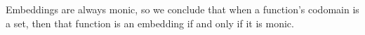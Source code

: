 Embeddings are always monic, so we conclude that when a function's codomain is a set, then that function is an embedding if and only if it is monic.
\ccpad
\begin{code}%
\>[0][@{}l@{\AgdaIndent{1}}]%
\>[1]\AgdaSpace{}%
\AgdaSymbol{:}%
\>[234I]\AgdaSymbol{(}\AgdaSpace{}%
\AgdaSymbol{:}\AgdaSpace{}%
\AgdaSpace{}%
\AgdaSpace{}%
\AgdaSymbol{)}\AgdaSpace{}%
\AgdaSpace{}%
\AgdaSpace{}%
\AgdaSpace{}%
\AgdaSpace{}%
\AgdaSpace{}%
\AgdaSpace{}%
\AgdaSpace{}%
\AgdaSpace{}%
\<%
\\
\>[1]\AgdaSpace{}%
\AgdaSpace{}%
\AgdaSpace{}%
\AgdaSymbol{=}\AgdaSpace{}%
\AgdaSymbol{(}\AgdaSpace{}%
\AgdaSymbol{)}\AgdaOperator{\AgdaInductiveConstructor{,}}\AgdaSpace{}%
\AgdaSymbol{(}\AgdaSpace{}%
\AgdaSpace{}%
\AgdaSymbol{)}\<%
\end{code}
